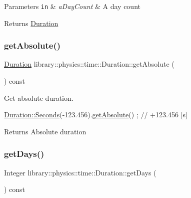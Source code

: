 \begin{DoxyParams}[1]{Parameters}
\mbox{\tt in}  & {\em a\+Day\+Count} & A day count \\
\hline
\end{DoxyParams}
\begin{DoxyReturn}{Returns}
\hyperlink{classlibrary_1_1physics_1_1time_1_1_duration}{Duration} 
\end{DoxyReturn}
\mbox{\label{classlibrary_1_1physics_1_1time_1_1_duration_afbe401469b6b6356439d6f7c5b21e67e}} 
\subsubsection{\texorpdfstring{get\+Absolute()}{getAbsolute()}}
{\footnotesize\ttfamily \hyperlink{classlibrary_1_1physics_1_1time_1_1_duration}{Duration} library\+::physics\+::time\+::\+Duration\+::get\+Absolute (\begin{DoxyParamCaption}{ }\end{DoxyParamCaption}) const}



Get absolute duration. 


\begin{DoxyCode}
\hyperlink{classlibrary_1_1physics_1_1time_1_1_duration_ae10891c94a1b2278c444cb44b37132f1}{Duration::Seconds}(-123.456).\hyperlink{classlibrary_1_1physics_1_1time_1_1_duration_afbe401469b6b6356439d6f7c5b21e67e}{getAbsolute}() ; \textcolor{comment}{// +123.456 [s]}
\end{DoxyCode}


\begin{DoxyReturn}{Returns}
Absolute duration 
\end{DoxyReturn}
\mbox{\label{classlibrary_1_1physics_1_1time_1_1_duration_a06ffb87b3c946a64a69000784488ab5c}} 
\subsubsection{\texorpdfstring{get\+Days()}{getDays()}}
{\footnotesize\ttfamily Integer library\+::physics\+::time\+::\+Duration\+::get\+Days (\begin{DoxyParamCaption}{ }\end{DoxyParamCaption}) const}




